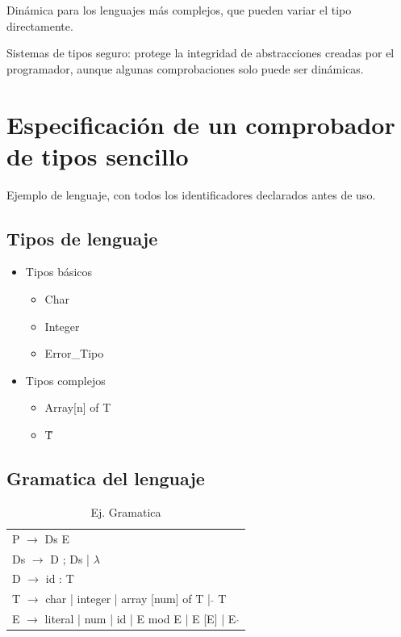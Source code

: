 \documentclass[12pt, twoside, openright]{report} %
\begin{document}
Dinámica para los lenguajes más complejos, que pueden variar el tipo directamente.

Sistemas de tipos seguro: protege la integridad de abstracciones creadas por el programador, aunque algunas comprobaciones solo puede ser dinámicas.

\section{Especificación de un comprobador de tipos sencillo}

Ejemplo de lenguaje, con todos los identificadores declarados antes de uso.

\subsection{Tipos de lenguaje}
\begin{itemize}
	\item Tipos básicos
	      \begin{itemize}
		      \item Char
		      \item Integer
		      \item Error\_Tipo
	      \end{itemize}
	\item Tipos complejos
	      \begin{itemize}
		      \item Array[n] of T
		      \item \^ T
	      \end{itemize}
\end{itemize}

\subsection{Gramatica del lenguaje}

\begin{table}[H]
	\begin{tabular}{l}
		P $\rightarrow$ Ds E                                              \\
		Ds $\rightarrow$ D ; Ds | $\lambda$                               \\
		D $\rightarrow$ id : T                                            \\
		T $\rightarrow$ char | integer | array [num] of T | $\hat{}$ T    \\
		E $\rightarrow$ literal | num | id | E mod E | E [E] | E $\hat{}$
	\end{tabular}
	\caption{Ej. Gramatica}
\end{table}
\end{document}
